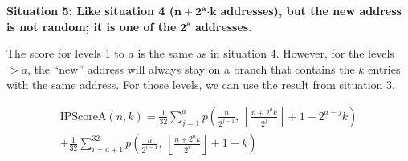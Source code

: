 \textbf{Situation 5: Like situation 4
(}\(\mathbf{n +}\mathbf{2}^{\mathbf{a}}\mathbf{\cdot k}\)
\textbf{addresses), but the new address is not random; it is one of the}
\(\mathbf{2}^{\mathbf{a}}\) \textbf{addresses.}

The score for levels 1 to \(a\) is the same as in situation 4. However,
for the levels \(> a\), the ``new'' address will always stay on a branch
that contains the \(k\) entries with the same address. For those levels,
we can use the result from situation 3.

\[
\begin{split}
\text{IPScoreA}(n,k) = \frac{1}{32} \sum_{j = 1}^{a}{p\left( \frac{n}{2^{j - 1}},\ \left\lfloor \frac{n + 2^{a}k}{2^{j}} \right\rfloor + 1 - 2^{a - j}k \right)}\\
+ \frac{1}{32} \sum_{i = a + 1}^{32}{p\left( \frac{n}{2^{i - 1}},\ \left\lfloor \frac{n + 2^{a}k}{2^{i}} \right\rfloor + 1 - k \right)}
\end{split}
\]

